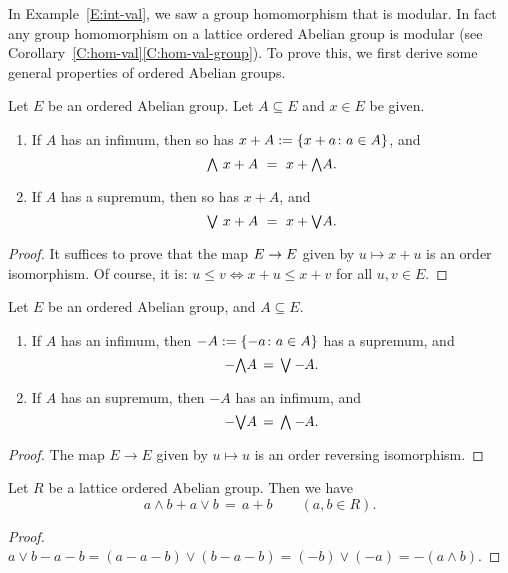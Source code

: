 \documentclass[main.tex]{subfiles}
\begin{document}
In Example~\ref{E:int-val},
we saw a group homomorphism that is modular.
In fact any group homomorphism
on a lattice ordered Abelian group is modular
(see Corollary~\ref{C:hom-val}\ref{C:hom-val-group}).
To prove this,
we first derive some general properties
of ordered Abelian groups.
%
%
\begin{lem}
\label{L:oag-plus-preserves}
Let $E$ be an ordered Abelian group.
Let $A\subseteq E$ and $x\in E$ be given.
\begin{enumerate}
\item \label{L:oag-plus-preserves-meet}
If $A$ has an infimum,
then so has $x+A := \{ x+a\colon a\in A\}$,
and 
\begin{equation*}
\textstyle{\bigwedge} \,\,x+A \ =\  x+\textstyle{\bigwedge} A.
\end{equation*}
\item \label{L:oag-plus-preserves-join}
If $A$ has a supremum,
then so has $x+A$,
and 
\begin{equation*}
\textstyle{\bigvee} \,\,x+A \ =\  x+\textstyle{\bigvee} A.
\end{equation*}
\end{enumerate}
\end{lem}
\begin{proof}
It suffices to prove that the map $E\rightarrow E$
given by $u\mapsto x + u$ is an order isomorphism.
Of course,
it is: $u\leq v\iff x+u\leq x+v$ for all $u,v\in E$.
\end{proof}
%
%
\begin{lem}
\label{L:oag-minus-preserves}
Let $E$ be an ordered Abelian group,
and $A\subseteq E$.
\begin{enumerate}
\item
If $A$ has an infimum,
then $-A:= \{-a\colon a\in A\}$
has a supremum,
and 
\begin{equation*}
-\textstyle{\bigwedge} A \,=\, \textstyle{\bigvee} -\hspace{-3pt}A.
\end{equation*}
\item
If $A$ has an supremum,
then $-A$
has an infimum, and
\begin{equation*}
-\textstyle{\bigvee} A \,=\, \textstyle{\bigwedge} -\hspace{-3pt}A.
\end{equation*}
\end{enumerate}
\end{lem}
\begin{proof}
The map $E\rightarrow E$ given by
$u\mapsto u$ is an order reversing isomorphism.
\end{proof}
%
%
\begin{lem}
\label{L:1-valuation}
Let $R$ be a lattice ordered Abelian group.
Then we have 
\begin{equation*}
a\wedge b  + a\vee b \,=\, a+b \qquad(a,b\in R).
\end{equation*}
\end{lem}
\begin{proof}
$a\vee b - a - b
= (a - a - b) \vee (b - a - b)
= (-b)\vee(-a) = -(a\wedge b)$.
\end{proof}
\end{document}
